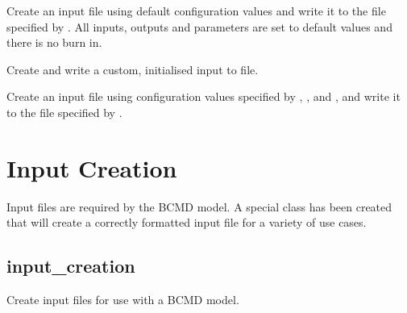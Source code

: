 \documentclass[letterpaper,10pt,english]{sphinxmanual}
\begin{document}
\begin{fulllineitems}
\begin{fulllineitems}
Create an input file using default configuration values and write it to
the file specified by {\hyperref[\detokenize{bcmdModel:bayescmd.bcmdModel.bcmd_model.ModelBCMD.input_file}]{}}. All inputs, outputs and
parameters are set to default values and there is no burn in.

\end{fulllineitems}


\begin{fulllineitems}
\label{\detokenize{bcmdModel:bayescmd.bcmdModel.ModelBCMD.write_initialised_input}}
Create and write a custom, initialised input to file.

Create an input file using configuration values specified by
{\hyperref[\detokenize{bcmdModel:bayescmd.bcmdModel.bcmd_model.ModelBCMD.inputs}]{}}, {\hyperref[\detokenize{bcmdModel:bayescmd.bcmdModel.bcmd_model.ModelBCMD.times}]{}}, {\hyperref[\detokenize{bcmdModel:bayescmd.bcmdModel.bcmd_model.ModelBCMD.params}]{}} and {\hyperref[\detokenize{bcmdModel:bayescmd.bcmdModel.bcmd_model.ModelBCMD.outputs}]{}}, and
write it to the file specified by {\hyperref[\detokenize{bcmdModel:bayescmd.bcmdModel.bcmd_model.ModelBCMD.input_file}]{}}.

\end{fulllineitems}


\end{fulllineitems}



\section{Input Creation}
\label{\detokenize{bcmdModel:input-creation}}
Input files are required by the BCMD model. A special class has been created
that will create a correctly formatted input file for a variety of use cases.


\subsection{input\_creation}
\label{\detokenize{bcmdModel:module-bayescmd.bcmdModel.input_creation}}\label{\detokenize{bcmdModel:id1}}
Create input files for use with a BCMD model.
\end{document}
